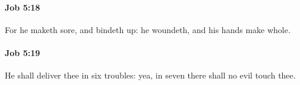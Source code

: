		\paragraph{Job 5:18} %
			\label{JOB-5-18}

			For he maketh sore, and bindeth up: he woundeth, and his hands make whole.


		\paragraph{Job 5:19} %
			\label{JOB-5-19}

			He shall deliver thee in six troubles: yea, in seven there shall no evil touch thee.


